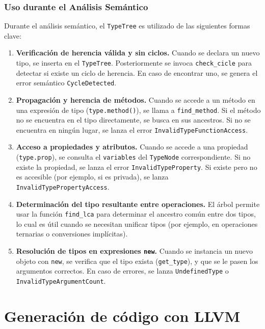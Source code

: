 \documentclass{article}
\begin{document}
\subsubsection*{Uso durante el Análisis Semántico}

Durante el análisis semántico, el \texttt{TypeTree} es utilizado de las siguientes formas clave:

\begin{enumerate}
    \item \textbf{Verificación de herencia válida y sin ciclos.} Cuando se declara un nuevo tipo, se inserta en el \texttt{TypeTree}. Posteriormente se invoca \texttt{check\_cicle} para detectar si existe un ciclo de herencia. En caso de encontrar uno, se genera el error semántico \texttt{CycleDetected}.

    \item \textbf{Propagación y herencia de métodos.} Cuando se accede a un método en una expresión de tipo (\texttt{type.method()}), se llama a \texttt{find\_method}. Si el método no se encuentra en el tipo directamente, se busca en sus ancestros. Si no se encuentra en ningún lugar, se lanza el error \texttt{InvalidTypeFunctionAccess}.

    \item \textbf{Acceso a propiedades y atributos.} Cuando se accede a una propiedad (\texttt{type.prop}), se consulta el \texttt{variables} del \texttt{TypeNode} correspondiente. Si no existe la propiedad, se lanza el error \texttt{InvalidTypeProperty}. Si existe pero no es accesible (por ejemplo, si es privada), se lanza \texttt{InvalidTypePropertyAccess}.

    \item \textbf{Determinación del tipo resultante entre operaciones.} El árbol permite usar la función \texttt{find\_lca} para determinar el ancestro común entre dos tipos, lo cual es útil cuando se necesitan unificar tipos (por ejemplo, en operaciones ternarias o conversiones implícitas).

    \item \textbf{Resolución de tipos en expresiones \texttt{new}.} Cuando se instancia un nuevo objeto con \texttt{new}, se verifica que el tipo exista (\texttt{get\_type}), y que se le pasen los argumentos correctos. En caso de errores, se lanza \texttt{UndefinedType} o \texttt{InvalidTypeArgumentCount}.
\end{enumerate}

\section{Generación de código con LLVM}
\end{document}
